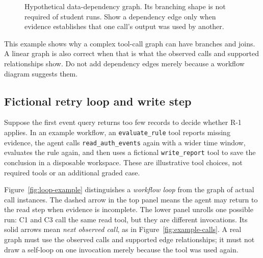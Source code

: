 \documentclass[11pt]{article}
\begin{document}
\begin{figure}[ht]
  \centering
  \caption{Hypothetical data-dependency graph. Its branching shape is not required of student runs. Show a dependency edge only when evidence establishes that one call's output was used by another.}
  \label{fig:dependency-example}
\end{figure}

This example shows why a complex tool-call graph can have branches and joins. A linear graph is also correct when that is what the observed calls and supported relationships show. Do not add dependency edges merely because a workflow diagram suggests them.

\subsection*{Fictional retry loop and write step}
Suppose the first event query returns too few records to decide whether R-1 applies. In an example workflow, an \texttt{evaluate\_rule} tool reports missing evidence, the agent calls \texttt{read\_auth\_events} again with a wider time window, evaluates the rule again, and then uses a fictional \texttt{write\_report} tool to save the conclusion in a disposable workspace. These are illustrative tool choices, not required tools or an additional graded case.

Figure~\ref{fig:loop-example} distinguishes a \emph{workflow loop} from the graph of actual call instances. The dashed arrow in the top panel means the agent may return to the read step when evidence is incomplete. The lower panel unrolls one possible run: C1 and C3 call the same read tool, but they are different invocations. Its solid arrows mean \emph{next observed call}, as in Figure~\ref{fig:example-calls}. A real graph must use the observed calls and supported edge relationships; it must not draw a self-loop on one invocation merely because the tool was used again.
\end{document}
